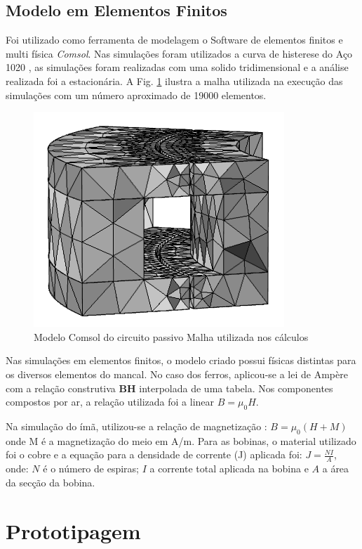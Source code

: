  \subsection{Modelo em Elementos Finitos}
 
 Foi utilizado como ferramenta de modelagem o Software de elementos finitos e multi física \textit{Comsol}. Nas simulações foram utilizados a curva de histerese do Aço 1020 , as simulações foram realizadas com uma solido tridimensional e a análise realizada foi a estacionária.  A Fig. \ref{Fig:Simulacao:Passivo:Mesh} ilustra a malha utilizada na execução das simulações com um número aproximado de 19000 elementos.
 
 \begin{figure}[!ht]
 	\centering
 	\includegraphics[width=0.5 \columnwidth,angle=0]{Figs/Simulacoes/Passivo/3D_Mesh=1,2.png}
 	\caption{Modelo Comsol do circuito passivo Malha utilizada nos cálculos}
 	\label{Fig:Simulacao:Passivo:Mesh}
 \end{figure}
 
Nas simulações em elementos finitos, o modelo criado possui físicas distintas para os diversos elementos do mancal. No caso dos ferros, aplicou-se a lei de Ampère com a relação construtiva \textbf{BH} interpolada de uma tabela. Nos componentes compostos por ar, a relação utilizada foi a linear $B=\mu_0 H$. 

Na simulação do ímã, utilizou-se a relação de magnetização : $B = \mu_0 (H + M)$ onde M é a magnetização do meio em A/m. Para as bobinas, o material utilizado foi o cobre e a equação para a densidade de corrente (J) aplicada foi: $ J = \frac{N I}{A}$, onde: $N$ é o número de espiras; $I$ a corrente total aplicada na bobina e $A$ a área da secção da bobina.





\section{Prototipagem}

